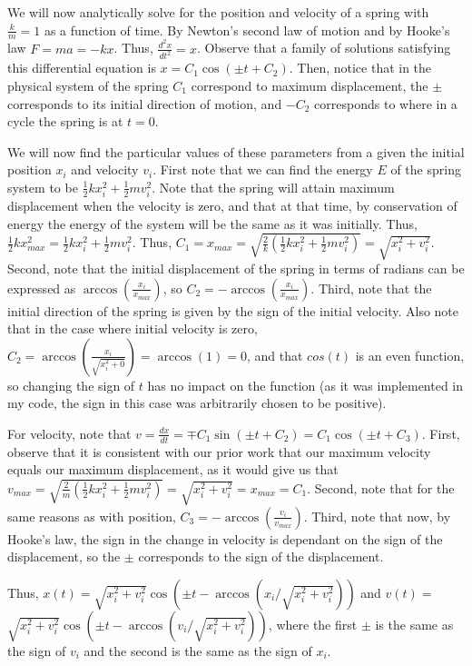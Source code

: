 \documentclass[10pt]{article}
\newenvironment{problem}[2][Problem]{\begin{trivlist}
\item[\hskip \labelsep {\bfseries #1}\hskip \labelsep {\bfseries #2.}]}{\end{trivlist}}
\begin{document}
\begin{problem}{2}
We will now analytically solve for the position and velocity of a spring with $\frac{k}{m}=1$ as a function of time. By Newton's second law of motion and by Hooke's law $F=ma=-kx$. Thus, $\frac{d^2x}{dt^2}=x$. Observe that a family of solutions satisfying this differential equation is $x = C_1 \cos(\pm t+C_2)$. Then, notice that in the physical system of the spring $C_1$ correspond to maximum displacement, the $\pm$ corresponds to its initial direction of motion, and $-C_2$ corresponds to where in a cycle the spring is at $t=0$. 

We will now find the particular values of these parameters from a given the initial position $x_i$ and velocity $v_i$. First note that we can find the energy $E$ of the spring system to be $\frac{1}{2}kx_i^2 + \frac{1}{2}mv_i^2$.
Note that the spring will attain maximum displacement when the velocity is zero, and that at that time, by conservation of energy the energy of the system will be the same as it was initially. Thus, $\frac{1}{2}kx_{max}^2= \frac{1}{2}kx_i^2 + \frac{1}{2}mv_i^2$. Thus, $C_1=x_{max}= \sqrt{\frac{2}{k} (\frac{1}{2}kx_i^2 + \frac{1}{2}mv_i^2)} = \sqrt{x_i^2 + v_i^2}$. Second, note that the initial displacement of the spring in terms of radians can be expressed as $\arccos(\frac{x_i}{x_{max}})$, so $C_2 = -\arccos(\frac{x_i}{x_{max}})$. Third, note that the initial direction of the spring is given by the sign of the initial velocity. Also note that in the case where initial velocity is zero, $C_2=\arccos(\frac{x_i}{\sqrt{x_i^2+0}})=\arccos(1)=0$, and that $cos(t)$ is an even function, so changing the sign of $t$ has no impact on the function (as it was implemented in my code, the sign in this case was arbitrarily chosen to be positive). 

For velocity, note that $v=\frac{dx}{dt}=\mp C_1\sin(\pm t+C_2)=C_1\cos(\pm t+C_3)$. First, observe that it is consistent with our prior work that our maximum velocity equals our maximum displacement, as it would give us that $v_{max}= \sqrt{\frac{2}{m} (\frac{1}{2}kx_i^2 + \frac{1}{2}mv_i^2)} = \sqrt{x_i^2 + v_i^2} = x_{max}=C_1$. Second, note that for the same reasons as with position, $C_3=-\arccos(\frac{v_i}{v_{max}})$. Third, note that now, by Hooke's law, the sign in the change in velocity is dependant on the sign of the displacement, so the $\pm$ corresponds to the sign of the displacement.

Thus, $x(t)=\sqrt{x_i^2 + v_i^2}\cos(\pm t-\arccos(x_i/\sqrt{x_i^2 + v_i^2}))$ and $v(t)=$ \newline $\sqrt{x_i^2 + v_i^2}\cos(\pm t-\arccos(v_i/\sqrt{x_i^2 + v_i^2}))$, where the first $\pm$ is the same as the sign of $v_i$ and the second is the same as the sign of $x_i$.

\end{problem}
\end{document}
